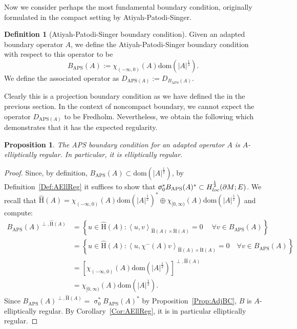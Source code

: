\documentclass[a4paper,10pt,reqno]{amsart}
\newcommand{\sym}{\upsigma}
\newcommand{\dbrac}[1]{\left\{#1\right\}}
\newcommand{\modulus}[1]{|#1|}
\newcommand{\set}[1]{\dbrac{#1}}
\newcommand{\Hard}[2][{}]{{\rm H}^{#2}_{\rm #1}}%
\newcommand{\SobH}[2][{}]{\Hard[#1]{\rm #2}}
\newcommand{\checkH}{\check{\mathrm{H}}}
\newcommand{\hatH}{\hat{\mathrm{H}}}
\newcommand{\dom}{\mathrm{dom}}
\newcommand{\inprod}[1]{\left\langle #1 \right\rangle}%
\newcommand{\APS}{\mathrm{APS}}
\newcommand{\dM}{\partial M}
\newtheorem{proposition}[theorem]{Proposition}
\theoremstyle{definition}
\newtheorem{definition}[theorem]{Definition}
\begin{document}
Now we consider perhaps the most fundamental boundary condition, originally formulated in the compact setting by Atiyah-Patodi-Singer.

\begin{definition}[Atiyah-Patodi-Singer boundary condition]
Given an adapted boundary operator $A$, we define the Atiyah-Patodi-Singer boundary condition with respect to this operator to be
$$ B_{\APS}(A) := \chi_{(-\infty,0)}(A)\dom(\modulus{A}^\frac12).$$
We define the associated operator as $D_{\APS(A)} := D_{B_{\APS}(A)}$.
\end{definition}

Clearly this is a projection boundary condition as we have defined the in the previous section.
In the context of noncompact boundary, we cannot expect the operator $D_{\APS(A)}$ to be Fredholm.
Nevertheless, we obtain the following which demonstrates that it has the expected regularity.

\begin{proposition}\label{Prop:APS=Aelliptic}
The APS boundary condition for an adapted operator $A$ is $A$-elliptically regular.
In particular, it is elliptically regular.
\end{proposition}
\begin{proof}
Since, by definition, $B_\APS(A)\subset \dom(\modulus{A}^{\frac12})$, by Definition~\ref{Def:AEllReg} it suffices to show that $\sym_0^\ast B_{\APS}(A)^\ast \subset \SobH[loc]{\frac12}(\dM;E)$.
We recall that $\hatH(A) = \chi_{(-\infty,0)}(A) \dom(\modulus{A}^{\frac12})^\ast \oplus \chi_{[0,\infty)}(A) \dom(\modulus{A}^{\frac12})$ and compute:
\begin{align*}
B_{\APS}(A)^{\perp,\hatH(A)}
 & =
\set{u \in \hatH(A): \inprod{u,v}_{\hatH(A) \times \checkH(A)} = 0\ \quad\forall v \in B_{\APS}(A)}           \\
 & =
\set{u \in \hatH(A): \inprod{u, \chi^-(A)v}_{\hatH(A) \times \checkH(A)} = 0 \quad \forall v \in B_{\APS}(A)} \\
 & =
[\chi_{(-\infty,0)}(A) \dom(\modulus{A}^{\frac12})]^{\perp, \hatH(A)}                                         \\
 & =
\chi_{[0,\infty)}(A) \dom(\modulus{A}^{\frac12}).
\end{align*}
Since $B_{\APS}(A)^{\perp,\hatH(A)} = \sym_0^\ast B_{\APS}(A)^\ast$ by Proposition~\ref{Prop:AdjBC}, $B$ is $A$-elliptically regular.
By Corollary~\ref{Cor:AEllReg}, it is in particular elliptically regular.
\end{proof}
\end{document}
